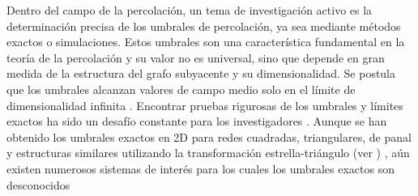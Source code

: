 Dentro del campo de la percolación, un tema de investigación activo es la determinación precisa de los umbrales de percolación, ya sea mediante métodos exactos o simulaciones. Estos umbrales son una característica fundamental en la teoría de la percolación y su valor no es universal, sino que depende en gran medida de la estructura del grafo subyacente y su dimensionalidad. Se postula que los umbrales alcanzan valores de campo medio solo en el límite de dimensionalidad infinita \cite{Artem,fisher_cluster_2004}. Encontrar pruebas rigurosas de los umbrales y límites exactos ha sido un desafío constante para los investigadores \cite{kesten_critical_1980,wierman_bond_1984,grimmett_percolation_2013}. Aunque se han obtenido los umbrales exactos en 2D para redes cuadradas, triangulares, de panal y estructuras similares utilizando la transformación estrella-triángulo (ver ) \cite{wierman_bond_1984}, aún existen numerosos sistemas de interés para los cuales los umbrales exactos son desconocidos


